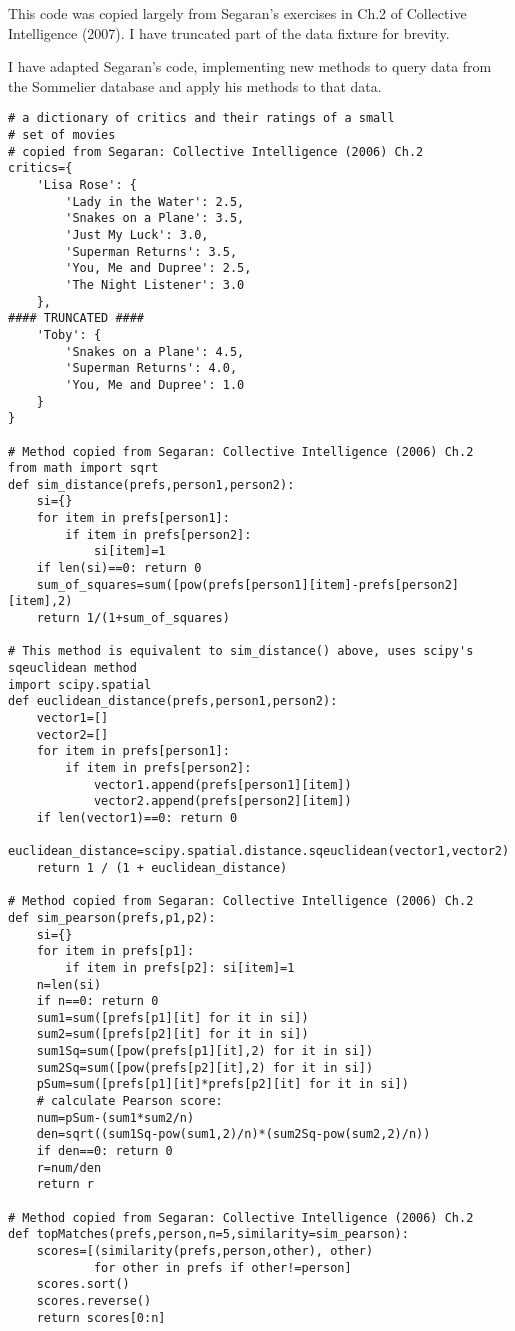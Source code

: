 This code was copied largely from Segaran's exercises in Ch.2 of Collective Intelligence (2007). I have truncated part of the data fixture for brevity.

I have adapted Segaran's code, implementing new methods to query data from the Sommelier database and apply his methods to that data.

\begin{verbatim}
# a dictionary of critics and their ratings of a small
# set of movies
# copied from Segaran: Collective Intelligence (2006) Ch.2
critics={
    'Lisa Rose': {
        'Lady in the Water': 2.5,
        'Snakes on a Plane': 3.5,
        'Just My Luck': 3.0,
        'Superman Returns': 3.5,
        'You, Me and Dupree': 2.5,
        'The Night Listener': 3.0
    },
#### TRUNCATED ####
    'Toby': {
        'Snakes on a Plane': 4.5,
        'Superman Returns': 4.0,
        'You, Me and Dupree': 1.0
    }
}

# Method copied from Segaran: Collective Intelligence (2006) Ch.2
from math import sqrt
def sim_distance(prefs,person1,person2):
    si={}
    for item in prefs[person1]:
        if item in prefs[person2]:
            si[item]=1
    if len(si)==0: return 0
    sum_of_squares=sum([pow(prefs[person1][item]-prefs[person2][item],2)
    return 1/(1+sum_of_squares)

# This method is equivalent to sim_distance() above, uses scipy's sqeuclidean method
import scipy.spatial
def euclidean_distance(prefs,person1,person2):
    vector1=[]
    vector2=[]
    for item in prefs[person1]:
        if item in prefs[person2]:
            vector1.append(prefs[person1][item])
            vector2.append(prefs[person2][item])
    if len(vector1)==0: return 0
    euclidean_distance=scipy.spatial.distance.sqeuclidean(vector1,vector2)
    return 1 / (1 + euclidean_distance)

# Method copied from Segaran: Collective Intelligence (2006) Ch.2
def sim_pearson(prefs,p1,p2):
    si={}
    for item in prefs[p1]:
        if item in prefs[p2]: si[item]=1
    n=len(si)
    if n==0: return 0
    sum1=sum([prefs[p1][it] for it in si])
    sum2=sum([prefs[p2][it] for it in si])
    sum1Sq=sum([pow(prefs[p1][it],2) for it in si])
    sum2Sq=sum([pow(prefs[p2][it],2) for it in si])
    pSum=sum([prefs[p1][it]*prefs[p2][it] for it in si])
    # calculate Pearson score:
    num=pSum-(sum1*sum2/n)
    den=sqrt((sum1Sq-pow(sum1,2)/n)*(sum2Sq-pow(sum2,2)/n))
    if den==0: return 0
    r=num/den
    return r

# Method copied from Segaran: Collective Intelligence (2006) Ch.2
def topMatches(prefs,person,n=5,similarity=sim_pearson):
    scores=[(similarity(prefs,person,other), other)
            for other in prefs if other!=person]
    scores.sort()
    scores.reverse()
    return scores[0:n]


\end{verbatim}

